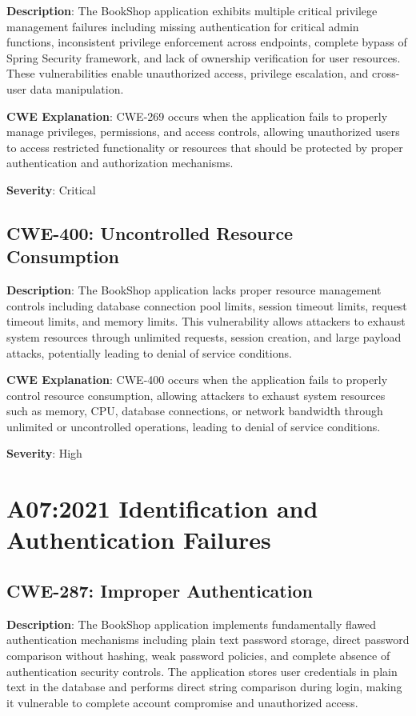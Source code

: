 \documentclass[]{UCD_CS_FYP_Report}
\begin{document}
\textbf{Description}: The BookShop application exhibits multiple critical privilege management failures including missing authentication for critical admin functions, inconsistent privilege enforcement across endpoints, complete bypass of Spring Security framework, and lack of ownership verification for user resources. These vulnerabilities enable unauthorized access, privilege escalation, and cross-user data manipulation.

\textbf{CWE Explanation}: CWE-269 occurs when the application fails to properly manage privileges, permissions, and access controls, allowing unauthorized users to access restricted functionality or resources that should be protected by proper authentication and authorization mechanisms.

\textbf{Severity}: Critical



\section{CWE-400: Uncontrolled Resource Consumption}

\textbf{Description}: The BookShop application lacks proper resource management controls including database connection pool limits, session timeout limits, request timeout limits, and memory limits. This vulnerability allows attackers to exhaust system resources through unlimited requests, session creation, and large payload attacks, potentially leading to denial of service conditions.

\textbf{CWE Explanation}: CWE-400 occurs when the application fails to properly control resource consumption, allowing attackers to exhaust system resources such as memory, CPU, database connections, or network bandwidth through unlimited or uncontrolled operations, leading to denial of service conditions.

\textbf{Severity}: High



\chapter{A07:2021 Identification and Authentication Failures}

\section{CWE-287: Improper Authentication}

\textbf{Description}: The BookShop application implements fundamentally flawed authentication mechanisms including plain text password storage, direct password comparison without hashing, weak password policies, and complete absence of authentication security controls. The application stores user credentials in plain text in the database and performs direct string comparison during login, making it vulnerable to complete account compromise and unauthorized access.
\end{document}
